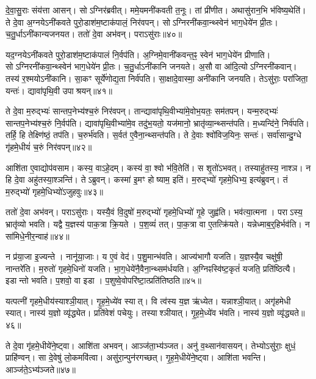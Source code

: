 दे॒वा॒सु॒राः संय॑त्ता आसन्।
सोऽग्निर॑ब्रवीत्।
ममे॒यमनी॑कवती त॒नूः।
तां प्री॑णीत।
अथासु॑रान॒भि भ॑विष्य॒थेति॑।
ते दे॒वा अ॒ग्नये\-ऽनी॑कवते पुरो॒डाश॑म॒ष्टाक॑पालं॒ निर॑वपन्।
सोऽग्निरनी॑कवा॒न्थ्स्वेन॑ भाग॒धेये॑न प्री॒तः।
च॒तु॒र्धा\-ऽनी॑कान्य\-जनयत।
ततो॑ दे॒वा अभ॑वन्।
पराऽसु॑राः॥४०॥

यद॒ग्नये\-ऽनी॑कवते पुरो॒डाश॑म॒ष्टाक॑पालं नि॒र्वप॑ति।
अ॒ग्निमे॒वानी॑कवन्त॒ꣴ॒ स्वेन॑ भाग॒धेये॑न प्रीणाति।
सोऽग्निरनी॑कवा॒न्थ्स्वेन॑ भाग॒धेये॑न प्री॒तः।
च॒तु॒र्धा\-ऽनी॑कानि जनयते।
अ॒सौ वा आ॑दि॒त्यो\-ऽग्निरनी॑कवान्।
तस्य॑ र॒श्मयो\-ऽनी॑कानि।
सा॒कꣳ सूर्ये॑णोद्य॒ता निर्व॑पति।
सा॒क्षादे॒वास्मा॒ अनी॑कानि जनयति।
तेऽसु॑राः॒ परा॑जिता॒ यन्तः॑।
द्यावा॑पृथि॒वी उपाश्रयन्॥४१॥

ते दे॒वा म॒रुद्भ्यः॑ सान्तप॒नेभ्य॑श्च॒रुं निर॑वपन्।
तान्द्यावा॑पृथि॒वी\-भ्या॑मे॒वोभ॒यतः॒ सम॑तपन्।
यन्म॒रुद्भ्यः॑ सान्तप॒नेभ्य॑श्च॒रुं नि॒र्वप॑ति।
द्यावा॑पृथि॒वीभ्या॑मे॒व तदु॑भ॒यतो॒ यज॑मानो॒ भ्रातृ॑व्या॒न्थ्सन्त॑पति।
म॒ध्यन्दि॑ने॒ निर्व॑पति।
तर्\mbox{}हि॒ हि तेक्ष्णि॑ष्ठं॒ तप॑ति।
च॒रुर्भ॑वति।
स॒र्वत॑ ए॒वैना॒न्थ्सन्त॑पति।
ते दे॒वाः श्वो॑विज॒यिनः॒ सन्तः॑।
सर्वा॑सान्दु॒ग्धे गृ॑हमे॒धीयं॑ च॒रुं निर॑वपन्॥४२॥

आशि॑ता ए॒वाद्योप॑वसाम।
कस्य॒ वाऽहे॒दम्।
कस्य॑ वा॒ श्वो भ॑वि॒तेति॑।
स शृ॒तो॑\-ऽभवत्।
तस्याहु॑तस्य॒ नाश्ञ\sn{}।
न हि दे॒वा अहु॑तस्या॒श्ञन्ति॑।
तेऽब्रुवन्।
कस्मा॑ इ॒मꣳ होष्याम॒ इति॑।
म॒रुद्भ्यो॑ गृहमे॒धिभ्य॒ इत्य॑ब्रुवन्।
तं म॒रुद्भ्यो॑ गृहमे॒धिभ्यो॑\-ऽजुहवुः॥४३॥

ततो॑ दे॒वा अभ॑वन्।
पराऽसु॑राः।
यस्यै॒वं वि॒दुषो॑ म॒रुद्भ्यो॑ गृहमे॒धिभ्यो॑ गृ॒हे जुह्व॑ति।
भव॑त्या॒त्मना।
पराऽस्य॒ भ्रातृ॑व्यो भवति।
यद्वै य॒ज्ञस्य॑ पाक॒त्रा क्रि॒यते।
प॒श॒व्यं॑ तत्।
पा॒क॒त्रा वा ए॒तत्क्रि॑यते।
यन्नेध्माब॒र्॒हिर्भव॑ति।
न सा॑मिधे॒नीर॒न्वाह॑॥४४॥

न प्र॑या॒जा इ॒ज्यन्ते।
नानू॑या॒जाः।
य ए॒वं वेद॑।
प॒शु॒मान्भ॑वति।
आज्य॑भागौ यजति।
य॒ज्ञस्यै॒व चक्षु॑षी॒ नान्तरे॑ति।
म॒रुतो॑ गृहमे॒धिनो॑ यजति।
भा॒ग॒धेये॑नै॒वैना॒न्थ्सम॑र्धयति।
अ॒ग्निꣴस्वि॑ष्ट॒कृतं॑ यजति॒ प्रति॑ष्ठित्यै।
इडान्तो भवति।
प॒शवो॒ वा इडा।
प॒शुष्वे॒वोपरि॑ष्टा॒त्प्रति॑तिष्ठति॥४५॥

यत्पत्नी॑ गृहमे॒धीय॑स्याश्ञी॒यात्।
गृ॒ह॒मे॒ध्ये॑व स्यात्।
वि त्व॑स्य य॒ज्ञ ऋ॑ध्येत।
यन्नाश्ञी॒यात्।
अगृ॑हमेधी स्यात्।
नास्य॑ य॒ज्ञो व्यृ॑द्ध्येत।
प्रति॑वेशं पचेयुः।
तस्याश्ञीयात्।
गृ॒ह॒मे॒ध्ये॑व भ॑वति।
नास्य॑ य॒ज्ञो व्यृ॑द्ध्यते॥४६॥

ते दे॒वा गृ॑हमे॒धीये॑ने॒ष्ट्वा।
आशि॑ता अभवन्।
आञ्ज॑ता॒भ्य॑ञ्जत।
अनु॑ व॒थ्सान॑वासयन्।
तेभ्यो\-ऽसु॑राः॒ क्षुधं॒ प्राहि॑ण्वन्।
सा दे॒वेषु॑ लो॒कमवि॑त्वा।
असु॑रा॒न्पुन॑रगच्छत्।
गृ॒ह॒मे॒धीये॑ने॒ष्ट्वा।
आशि॑ता भवन्ति।
आञ्ज॑ते॒\-ऽभ्य॑ञ्जते॥४७॥

